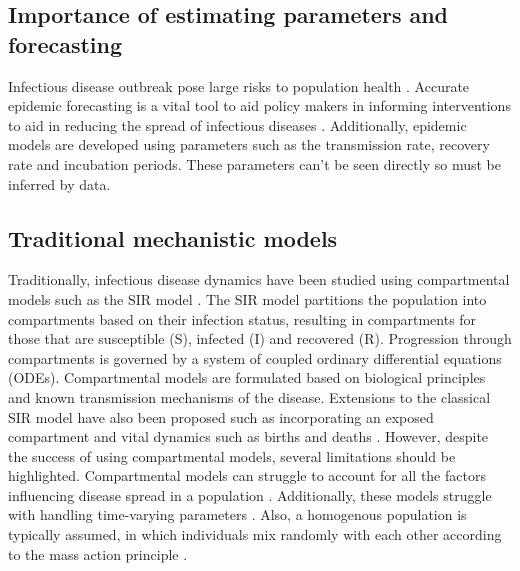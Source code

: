 \documentclass{article}
\begin{document}
\subsection{Importance of estimating parameters and forecasting}
Infectious disease outbreak pose large risks to population health \parencite{Liu}. Accurate epidemic forecasting is a vital tool to aid policy makers in informing interventions to aid in reducing the spread of infectious diseases \parencite{Desai2019}. Additionally, epidemic models are developed using parameters such as the transmission rate, recovery rate and incubation periods. These parameters can't be seen directly so must be inferred by data.

\subsection{Traditional mechanistic models}
Traditionally, infectious disease dynamics have been studied using compartmental models such as the SIR model \parencite{Kermack1927}. The SIR model partitions the population into compartments based on their infection status, resulting in compartments for those that are susceptible (S), infected (I) and recovered (R). Progression through compartments is governed by a system of coupled ordinary differential equations (ODEs). Compartmental models are formulated based on biological principles and known transmission mechanisms of the disease. Extensions to the classical SIR model have also been proposed such as incorporating an exposed compartment \parencite{Piovella2020} and vital dynamics such as births and deaths \parencite{Lopez-de-la-Cruz2025}. However, despite the success of using compartmental models, several limitations should be highlighted. Compartmental models can struggle to account for all the factors influencing disease spread in a population \parencite{Zhao2024}. Additionally, these models struggle with handling time-varying parameters \parencite{Millevoi2024}. Also, a homogenous population is typically assumed, in which individuals mix randomly with each other according to the mass action principle \parencite{Bansal2007}. 
\end{document}
